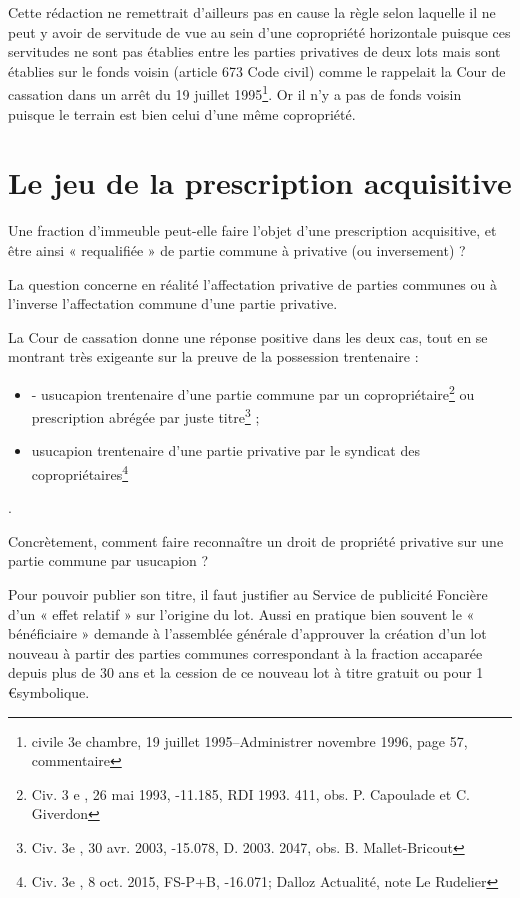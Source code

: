 		Cette rédaction ne remettrait d’ailleurs pas en cause la règle selon laquelle il ne peut y avoir de servitude
		de vue au sein d’une copropriété horizontale puisque ces servitudes ne sont pas établies entre les parties
		privatives de deux lots mais sont établies sur le fonds voisin (article 673 Code civil) comme le rappelait la
		Cour de cassation dans un arrêt du 19 juillet 1995\footnote{civile 3e chambre, 19 juillet 1995–Administrer novembre 1996, page 57, commentaire }. Or il n’y a pas de fonds voisin puisque le terrain est
		bien celui d’une même copropriété.

	
\section{Le jeu de la prescription acquisitive}

	Une fraction d’immeuble peut-elle faire l’objet d’une prescription acquisitive, et être ainsi « requalifiée »
	de partie commune à privative (ou inversement) ?
	
	La question concerne en réalité l’affectation privative de parties communes ou à l’inverse l’affectation
	commune d’une partie privative.
	
	La Cour de cassation donne une réponse positive dans les deux cas, tout en se montrant très exigeante sur
	la preuve de la possession trentenaire :
	\begin{itemize}
		\item - usucapion trentenaire d’une partie commune par un	copropriétaire\footnote{Civ. 3 e , 26 mai 1993, -11.185, RDI 1993. 411, obs. P. Capoulade et C. Giverdon} ou prescription abrégée par juste titre\footnote{Civ. 3e , 30 avr. 2003, -15.078, D. 2003. 2047, obs. B. Mallet-Bricout} ;
		\item  usucapion trentenaire d’une partie privative par le syndicat des	copropriétaires\footnote{Civ. 3e , 8 oct. 2015, FS-P+B, -16.071; Dalloz Actualité, note Le Rudelier}
	\end{itemize}.
	
	Concrètement, comment faire reconnaître un droit de propriété privative sur une partie commune par
	usucapion ?
	
	Pour pouvoir publier son titre, il faut justifier au Service de publicité Foncière d’un « effet relatif » sur
	l’origine du lot. Aussi en pratique bien souvent le « bénéficiaire » demande à l’assemblée générale
	d’approuver la création d’un lot nouveau à partir des parties communes correspondant à la fraction
	accaparée depuis plus de 30 ans et la cession de ce nouveau lot à titre gratuit ou pour 1 \euro symbolique.
	
